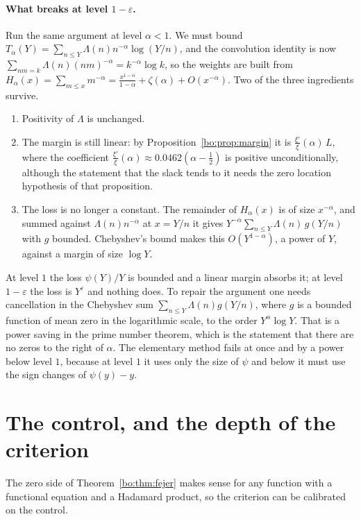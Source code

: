 \paragraph{What breaks at level $1-\varepsilon$.} Run the same argument at level $\alpha<1$. We must bound $T_\alpha(Y)=\sum_{n\le Y}\Lambda(n)n^{-\alpha}\log(Y/n)$, and the convolution identity is now $\sum_{nm=k}\Lambda(n)(nm)^{-\alpha}=k^{-\alpha}\log k$, so the weights are built from $H_\alpha(x)=\sum_{m\le x}m^{-\alpha}=\frac{x^{1-\alpha}}{1-\alpha}+\zeta(\alpha)+O(x^{-\alpha})$. Two of the three ingredients survive.
\begin{enumerate}
\item Positivity of $\Lambda$ is unchanged.
\item The margin is still linear: by Proposition~\ref{bo:prop:margin} it is $\frac{\xi'}{\xi}(\alpha)\,L$, where the coefficient $\frac{\xi'}{\xi}(\alpha)\approx0.0462(\alpha-\frac12)$ is positive unconditionally, although the statement that the slack tends to it needs the zero location hypothesis of that proposition.
\item The loss is no longer a constant. The remainder of $H_\alpha(x)$ is of size $x^{-\alpha}$, and summed against $\Lambda(n)n^{-\alpha}$ at $x=Y/n$ it gives $Y^{-\alpha}\sum_{n\le Y}\Lambda(n)\,g(Y/n)$ with $g$ bounded. Chebyshev's bound makes this $O(Y^{1-\alpha})$, a power of $Y$, against a margin of size $\log Y$.
\end{enumerate}
At level $1$ the loss $\psi(Y)/Y$ is bounded and a linear margin absorbs it; at level $1-\varepsilon$ the loss is $Y^{\varepsilon}$ and nothing does. To repair the argument one needs cancellation in the Chebyshev sum $\sum_{n\le Y}\Lambda(n)g(Y/n)$, where $g$ is a bounded function of mean zero in the logarithmic scale, to the order $Y^{\alpha}\log Y$. That is a power saving in the prime number theorem, which is the statement that there are no zeros to the right of $\alpha$. The elementary method fails at once and by a power below level $1$, because at level $1$ it uses only the size of $\psi$ and below it must use the sign changes of $\psi(y)-y$.

\section{The control, and the depth of the criterion}

The zero side of Theorem~\ref{bo:thm:fejer} makes sense for any function with a functional equation and a Hadamard product, so the criterion can be calibrated on the control.

